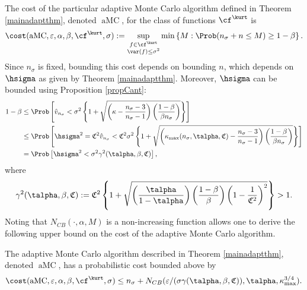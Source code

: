 \documentclass[graybox]{svmult}
\newcommand{\hv}{\hat{v}}
\newcommand{\fudge}{\mathfrak{C}}
\DeclareMathOperator{\aMC}{aMC}
\begin{document}
The cost of the particular adaptive Monte Carlo algorithm defined in Theorem \ref{mainadaptthm}, denoted $\aMC$, for the class of functions $\cf^{\kurt}$ is
\begin{equation}
\cost(\aMC,\varepsilon,\alpha, \beta, \cf^{\kurt}, \sigma) := \sup_{\substack{f \in \cf^{\kurt}\\ \var(f)\le \sigma^2} } \min\left\{M : \Prob(n_{\sigma} + n \le M) \ge 1-\beta  \right \}.
\end{equation}
Since $n_{\sigma}$ is fixed, bounding this cost depends on bounding $n$, which depends on $\hsigma$ as given by Theorem \ref{mainadaptthm}.  Moreover, $\hsigma$ can be bounded using Proposition \ref{propCant}:
\begin{align*}
1-\beta & \le \Prob\left[\hv_{n_{\sigma}} < \sigma^2 \left\{1 + \sqrt{\left ( \kappa  - \frac{n_{\sigma}-3}{n_{\sigma}-1}\right)\left(\frac{1-\beta}{\beta n_{\sigma}}\right)}\right\} \right] \\
& \le \Prob\left[\hsigma^2 = \fudge^2 \hv_{n_{\sigma}} < \fudge^2\sigma^2 \left\{1 + \sqrt{\left ( \kappa_{\max}(n_{\sigma},\talpha,\fudge)  - \frac{n_{\sigma}-3}{n_{\sigma}-1}\right)\left(\frac{1-\beta}{\beta n_{\sigma}}\right)}\right\} \right] \\
& = \Prob\left[\hsigma^2 < \sigma^2 \gamma^2(\talpha,\beta,\fudge) \right],
\end{align*}
where
\[
\gamma^2(\talpha,\beta,\fudge) := \fudge^2 \left\{1 + \sqrt{\left(\frac{ \talpha }{1-\talpha}\right) \left(\frac{1-\beta}{\beta}\right) \left(1 - \frac{1}{\fudge^2}\right)^2}\right\} > 1.
\]
Noting that $N_{CB}(\cdot,\alpha,M)$ is a non-increasing function allows one to derive the following upper bound on the cost of the adaptive Monte Carlo algorithm.

\begin{theorem} \label{costtheorem} The adaptive Monte Carlo algorithm described in Theorem \ref{mainadaptthm}, denoted $\aMC$, has a probabilistic cost bounded above by 
\begin{equation*}
\cost(\aMC,\varepsilon,\alpha, \beta, \cf^{\kurt}, \sigma)
\le n_{\sigma} + N_{CB}(\varepsilon/(\sigma\gamma(\talpha,\beta,\fudge)),\talpha,\kappa_{\max}^{3/4}).
\end{equation*} 
\end{theorem}
\end{document}
